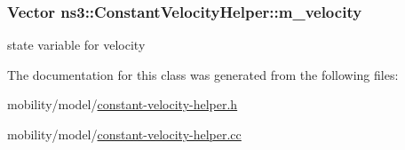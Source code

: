 \subsubsection[{\texorpdfstring{m\+\_\+velocity}{m_velocity}}]{\setlength{\rightskip}{0pt plus 5cm}Vector ns3\+::\+Constant\+Velocity\+Helper\+::m\+\_\+velocity\hspace{0.3cm}{\ttfamily [private]}}\hypertarget{classns3_1_1ConstantVelocityHelper_ae60e63f13f3f06441bd84bc639b89f6d}{}\label{classns3_1_1ConstantVelocityHelper_ae60e63f13f3f06441bd84bc639b89f6d}


state variable for velocity 



The documentation for this class was generated from the following files\+:\begin{DoxyCompactItemize}
\item 
mobility/model/\hyperlink{constant-velocity-helper_8h}{constant-\/velocity-\/helper.\+h}\item 
mobility/model/\hyperlink{constant-velocity-helper_8cc}{constant-\/velocity-\/helper.\+cc}\end{DoxyCompactItemize}
